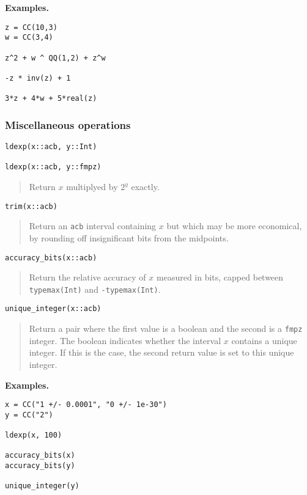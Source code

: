 \documentclass[a4paper,10pt]{article}
\newcommand{\code}{\lstinline}
\newcommand{\desc}[1]{\vspace{-3mm}\begin{quote}#1\end{quote}}
\begin{document}
{{\textbf{Examples.}

\begin{lstlisting}
z = CC(10,3)
w = CC(3,4)

z^2 + w ^ QQ(1,2) + z^w

-z * inv(z) + 1

3*z + 4*w + 5*real(z)
\end{lstlisting}

\subsubsection{Miscellaneous operations}

\begin{lstlisting}
ldexp(x::acb, y::Int)

ldexp(x::acb, y::fmpz)
\end{lstlisting}

\desc{Return $x$ multiplyed by $2^y$ exactly.}

\begin{lstlisting}
trim(x::acb)
\end{lstlisting}

\desc{Return an \code{acb} interval containing $x$ but which may be more economical,
by rounding off insignificant bits from the midpoints.}

\begin{lstlisting}
accuracy_bits(x::acb)
\end{lstlisting}

\desc{Return the relative accuracy of $x$ measured in bits, capped
between \code{typemax(Int)} and \code{-typemax(Int)}.}

\begin{lstlisting}
unique_integer(x::acb)
\end{lstlisting}

\desc{Return a pair where the first value is a boolean and the second
is a \code{fmpz} integer. The boolean indicates whether the interval $x$
contains a unique integer. If this is the case, the second return
value is set to this unique integer.}

\textbf{Examples.}

\begin{lstlisting}
x = CC("1 +/- 0.0001", "0 +/- 1e-30")
y = CC("2")

ldexp(x, 100)

accuracy_bits(x)
accuracy_bits(y)

unique_integer(y)
\end{lstlisting}

}}
\end{document}
